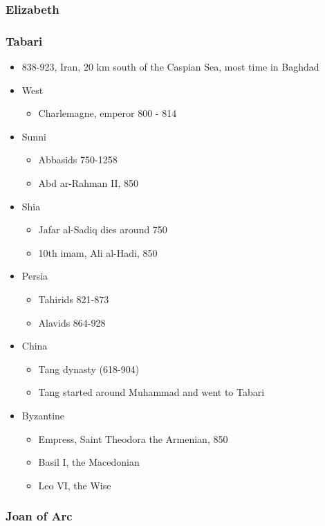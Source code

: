 \begin{frame}\frametitle{Elizabeth}\logoEvolution
\end{frame}


\begin{frame}\frametitle{Tabari}\logoEvolution
	\begin{itemize}\tiny
		\item 838-923, Iran, 20 km south of the Caspian Sea, most time in Baghdad
		\item West
			\begin{itemize}\tiny
				\item Charlemagne, emperor 800 - 814
			\end{itemize}
		\item Sunni
			\begin{itemize}\tiny
				\item Abbasids 750-1258
				\item Abd ar-Rahman II, 850
			\end{itemize}
		\item Shia
			\begin{itemize}\tiny
				\item Jafar al-Sadiq dies around 750
				\item 10th imam, Ali al-Hadi, 850
			\end{itemize}
		\item Persia
			\begin{itemize}\tiny
				\item Tahirids 821-873
				\item Alavids 864-928
			\end{itemize}
		\item China
			\begin{itemize}\tiny
				\item Tang dynasty (618-904)
				\item Tang started around Muhammad and went to Tabari
			\end{itemize}
		\item Byzantine
			\begin{itemize}\tiny
				\item Empress, Saint Theodora the Armenian, 850 
				\item Basil I, the Macedonian
				\item Leo VI, the Wise
			\end{itemize}
	\end{itemize}
\end{frame}



\begin{frame}\frametitle{Joan of Arc}\logoEvolution
\end{frame}






